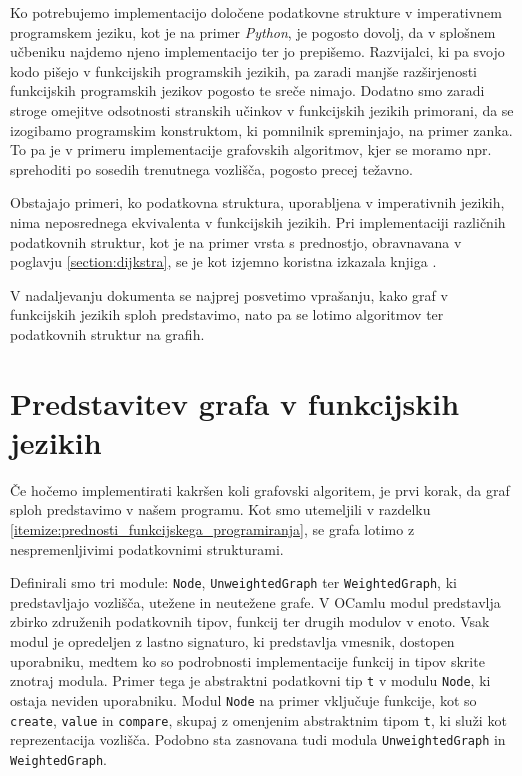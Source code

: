 \documentclass[mat1, tisk]{fmfdelo}
\begin{document}
Ko potrebujemo implementacijo določene podatkovne strukture v imperativnem programskem jeziku, kot je na primer
\textit{Python}, je pogosto dovolj, da v splošnem učbeniku najdemo njeno implementacijo ter jo prepišemo.
Razvijalci, ki pa svojo kodo pišejo v funkcijskih programskih jezikih, pa zaradi manjše
razširjenosti funkcijskih programskih jezikov pogosto te sreče nimajo.
Dodatno smo zaradi stroge omejitve odsotnosti stranskih učinkov v funkcijskih jezikih primorani, da se izogibamo
programskim konstruktom, ki pomnilnik spreminjajo, na primer zanka. To pa je v primeru implementacije grafovskih
algoritmov, kjer se moramo npr. sprehoditi po sosedih trenutnega vozlišča, pogosto precej težavno.

Obstajajo primeri, ko podatkovna struktura, uporabljena v imperativnih jezikih, nima neposrednega ekvivalenta v funkcijskih jezikih.
Pri implementaciji različnih podatkovnih struktur, kot je na primer vrsta s prednostjo, obravnavana v poglavju \ref{section:dijkstra},
se je kot izjemno koristna izkazala knjiga \cite{okasaki1996}.

V nadaljevanju dokumenta se najprej posvetimo vprašanju, kako graf v funkcijskih jezikih sploh predstavimo, 
nato pa se lotimo algoritmov ter podatkovnih struktur na grafih.

\section{Predstavitev grafa v funkcijskih jezikih}

Če hočemo implementirati kakršen koli grafovski algoritem, je prvi korak, da graf sploh predstavimo v našem programu.
Kot smo utemeljili v razdelku \ref{itemize:prednosti_funkcijskega_programiranja}, se grafa lotimo z nespremenljivimi
podatkovnimi strukturami.

Definirali smo tri module: \texttt{Node}, \texttt{UnweightedGraph} ter \texttt{WeightedGraph}, ki predstavljajo
vozlišča, utežene in neutežene grafe. V OCamlu modul predstavlja zbirko združenih podatkovnih tipov, funkcij ter drugih modulov v enoto.
Vsak modul je opredeljen z lastno signaturo, ki predstavlja vmesnik, dostopen uporabniku, medtem ko so podrobnosti
implementacije funkcij in tipov skrite znotraj modula. 
Primer tega je abstraktni podatkovni tip \texttt{t} v modulu \texttt{Node}, ki ostaja neviden uporabniku.
Modul \texttt{Node} na primer vključuje funkcije, kot so \texttt{create}, \texttt{value} in \texttt{compare},
skupaj z omenjenim abstraktnim tipom \texttt{t}, ki služi kot reprezentacija vozlišča.
Podobno sta zasnovana tudi modula \texttt{UnweightedGraph} in \texttt{WeightedGraph}.
\end{document}
